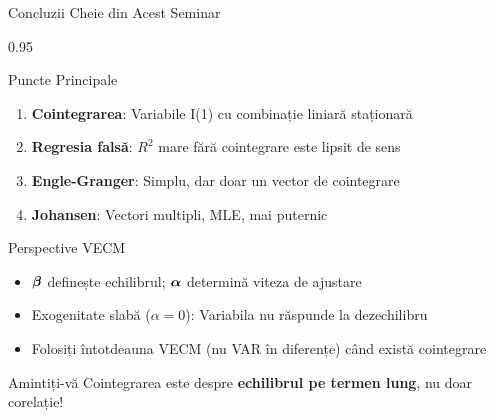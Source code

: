 \documentclass[9pt, aspectratio=169, t]{beamer}
\begin{document}
\begin{frame}{Concluzii Cheie din Acest Seminar}
    \begin{cminipage}{0.95\textwidth}
    {\footnotesize
    \begin{block}{Puncte Principale}
        \begin{enumerate}\setlength{\itemsep}{0pt}
            \item \textbf{Cointegrarea}: Variabile I(1) cu combinație liniară staționară
            \item \textbf{Regresia falsă}: $R^2$ mare fără cointegrare este lipsit de sens
            \item \textbf{Engle-Granger}: Simplu, dar doar un vector de cointegrare
            \item \textbf{Johansen}: Vectori multipli, MLE, mai puternic
        \end{enumerate}
    \end{block}
    \begin{block}{Perspective VECM}
        \begin{itemize}\setlength{\itemsep}{0pt}
            \item $\boldsymbol{\beta}$ definește echilibrul; $\boldsymbol{\alpha}$ determină viteza de ajustare
            \item Exogenitate slabă ($\alpha = 0$): Variabila nu răspunde la dezechilibru
            \item Folosiți întotdeauna VECM (nu VAR în diferențe) când există cointegrare
        \end{itemize}
    \end{block}
    \begin{alertblock}{Amintiți-vă}
        Cointegrarea este despre \textbf{echilibrul pe termen lung}, nu doar corelație!
    \end{alertblock}
    }
    \end{cminipage}
\end{frame}
\end{document}
